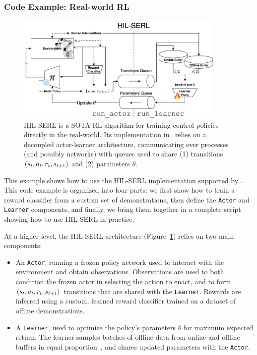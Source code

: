 \subsubsection{Code Example: Real-world RL}

\begin{figure}
    \centering
    \includegraphics[width=0.9\textwidth]{figures/ch3/ch3-hil-serl-architecture.pdf}
    \caption{HIL-SERL is a SOTA RL algorithm for training control policies directly in the real-world. Its implementation in \lerobot~relies on a decoupled actor-learner architecture, communicating over processes (and possibly networks) with queues used to share (1) transitions \( (s_t, a_t, r_t, s_{t+1}) \) and (2) parameters \( \theta \).}
    \label{fig:ch3-hil-serl-architecture}
\end{figure}

This example shows how to use the HIL-SERL implementation supported by \lerobot.
This code example is organized into four parts: we first show how to train a reward classifier from a custom set of demonstrations, then define the \texttt{Actor} and \texttt{Learner} components, and finally, we bring them together in a complete script showing how to use HIL-SERL in practice.

At a higher level, the HIL-SERL architecture (Figure~\ref{fig:ch3-hil-serl-architecture}) relies on two main components:
\begin{itemize}
    \item An \texttt{Actor}, running a frozen policy network used to interact with the environment and obtain observations. Observations are used to both condition the frozen actor in selecting the action to enact, and to form \( (s_t, a_t, r_t, s_{t+1}) \) transitions that are shared with the \texttt{Learner}. Rewards are inferred using a custom, learned reward classifier trained on a dataset of offline demonstrations.
    \item A \texttt{Learner}, used to optimize the policy's parameters \( \theta \) for maximum expected return. The learner samples batches of offline data from online and offline buffers in equal proportion~\citep{ballEfficientOnlineReinforcement2023}, and shares updated parameters with the \texttt{Actor}.
\end{itemize}

